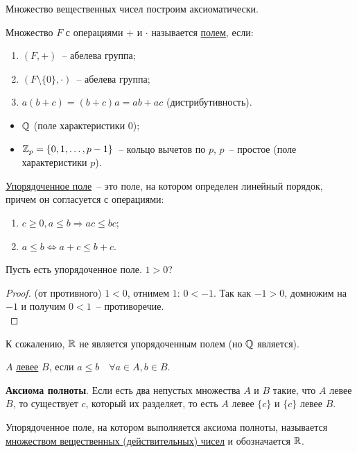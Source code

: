 Множество вещественных чисел построим аксиоматически.
\begin{defin}
	Множество $F$ с операциями $+$ и $\cdot$ называется \underline{полем}, если:
	\begin{enumerate}
		\item $(F,+)$~-- абелева группа;
		\item $(F \setminus \{0\}, \cdot)$~-- абелева группа;
		\item $a(b+c) = (b+c)a = ab+ac$ (дистрибутивность).
	\end{enumerate}
\end{defin}
\begin{ex}
	\begin{itemize}
		\item $\mathbb{Q}$ (поле характеристики $0$);
		\item $\mathbb{Z}_p = \{0,1,\dots,p-1\}$~-- кольцо вычетов по $p$, $p$~-- простое (поле характеристики $p$).
	\end{itemize}
\end{ex}

\begin{defin}
	\underline{Упорядоченное поле}~-- это поле, на котором определен линейный порядок, причем он согласуется с операциями:
	\begin{enumerate}
		\item $c \ge 0, a \le b \Rightarrow ac \le bc$;
		\item $a \le b \Leftrightarrow a+c \le b+c$.\\
	\end{enumerate}
\end{defin}

Пусть есть упорядоченное поле. $1 > 0$?
\begin{proof}
	(от противного) $1 < 0$, отнимем $1$: $0 < -1$. Так как $-1 > 0$, домножим на $-1$ и получим $0 < 1$~-- противоречие.\\
\end{proof}

К сожалению, $\mathbb{R}$ не является упорядоченным полем (но $\mathbb{Q}$ является).

\begin{defin}
	$A$ \underline{левее} $B$, если $a \le b \quad \forall a \in A, b \in B$.
\end{defin}

\textbf{Аксиома полноты}. Если есть два непустых множества $A$ и $B$ такие, что $A$ левее $B$, то существует $c$, который их разделяет, то есть $A$ левее $\{c\}$ и $\{c\}$ левее $B$.
\begin{defin}
	Упорядоченное поле, на котором выполняется аксиома полноты, называется \underline{множеством вещественных (действительных) чисел} и обозначается $\mathbb{R}$.
\end{defin}